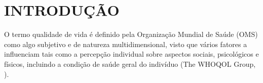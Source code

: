 \chapter{INTRODUÇÃO}
O termo qualidade de vida é definido pela Organização Mundial de Saúde (OMS) como algo subjetivo e de natureza multidimensional, visto que vários fatores a influenciam tais como a percepção individual sobre aspectos sociais, psicológicos e físicos, incluindo a condição de saúde geral do indivíduo (The WHOQOL Group, \citeyear{whoqol1995world}). 